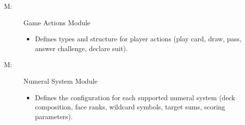 \documentclass[12pt, titlepage]{article}
\newcounter{mnum}
\newcommand{\mthemnum}{M\themnum}
\begin{document}
\begin{description}
\item [ \mthemnum \label{mGameActions}:] Game Actions Module
    \begin{itemize}
        \item Defines types and structure for player actions (play card, draw, pass, answer challenge, declare suit).
    \end{itemize}

\item [ \mthemnum \label{mNumeralSystem}:] Numeral System Module
    \begin{itemize}
        \item Defines the configuration for each supported numeral system (deck composition, face ranks, wildcard symbols, target sums, scoring parameters).
    \end{itemize}
\end{description}
\end{document}
